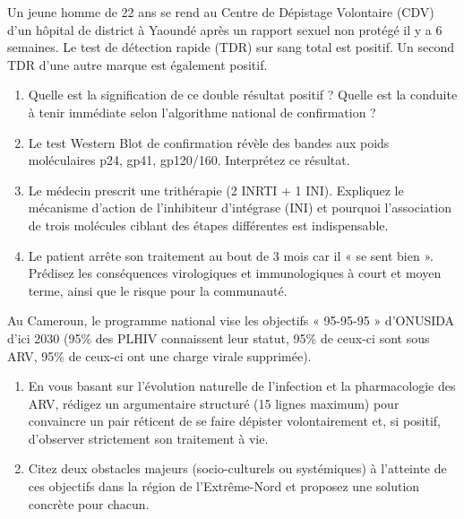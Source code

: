 \documentclass[11pt]{article}
\begin{document}
\begin{exercice}
Un jeune homme de 22 ans se rend au Centre de Dépistage Volontaire (CDV) d'un hôpital de district à Yaoundé après un rapport sexuel non protégé il y a 6 semaines. Le test de détection rapide (TDR) sur sang total est positif. Un second TDR d'une autre marque est également positif.
\begin{enumerate}
    \item Quelle est la signification de ce double résultat positif ? Quelle est la conduite à tenir immédiate selon l'algorithme national de confirmation ? 
    \item Le test Western Blot de confirmation révèle des bandes aux poids moléculaires p24, gp41, gp120/160. Interprétez ce résultat. 
    \item Le médecin prescrit une trithérapie (2 INRTI + 1 INI). Expliquez le mécanisme d'action de l'inhibiteur d'intégrase (INI) et pourquoi l'association de trois molécules ciblant des étapes différentes est indispensable. 
    \item Le patient arrête son traitement au bout de 3 mois car il « se sent bien ». Prédisez les conséquences virologiques et immunologiques à court et moyen terme, ainsi que le risque pour la communauté.
\end{enumerate}
\end{exercice}

\begin{exercice}
Au Cameroun, le programme national vise les objectifs « 95-95-95 » d'ONUSIDA d'ici 2030 (95\% des PLHIV connaissent leur statut, 95\% de ceux-ci sont sous ARV, 95\% de ceux-ci ont une charge virale supprimée).
\begin{enumerate}
    \item En vous basant sur l'évolution naturelle de l'infection et la pharmacologie des ARV, rédigez un argumentaire structuré (15 lignes maximum) pour convaincre un pair réticent de se faire dépister volontairement et, si positif, d'observer strictement son traitement à vie. 
    \item Citez deux obstacles majeurs (socio-culturels ou systémiques) à l'atteinte de ces objectifs dans la région de l'Extrême-Nord et proposez une solution concrète pour chacun.
\end{enumerate}
\end{exercice}
\end{document}
